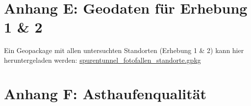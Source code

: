 \documentclass[
  oneside]{scrbook}
\begin{document}
\hypertarget{anhang-e-geodaten-fuxfcr-erhebung-1-2}{%
\section{Anhang E: Geodaten für Erhebung 1 \& 2}\label{anhang-e-geodaten-fuxfcr-erhebung-1-2}}

Ein Geopackage mit allen untersuchten Standorten (Erhebung 1 \& 2) kann hier heruntergeladen werden: \href{https://github.com/wieselundco/erfolgskontrolle/raw/master/images/spurentunnel_fotofallen_standorte.gpkg}{spurentunnel\_fotofallen\_standorte.gpkg}

\hypertarget{anhang-asthaufen-qualitaet}{%
\section{Anhang F: Asthaufenqualität}\label{anhang-asthaufen-qualitaet}}
\end{document}
